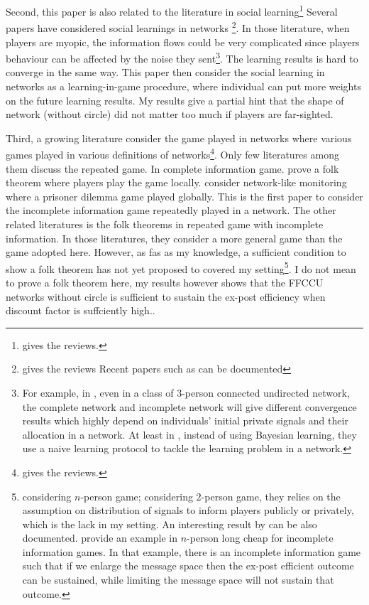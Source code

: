\documentclass[12pt,letter]{article}
\theoremstyle{definition}
\theoremstyle{remark}
\theoremstyle{claim}
\begin{document}
Second, this paper is also related to the literature in social learning\footnote{\citep{Bikhchandani1998} \citep{Cao2001} gives the reviews.} Several papers have considered social learnings in networks \footnote{\citep{Goyal2012} gives the reviews Recent papers such as \citep{Acemoglu2011}\citep{Chatterjee2011} can be documented}. In those literature, when players are myopic, the information flows could be very complicated since players behaviour can be affected by the noise they sent\footnote{For example, in \citep{RePEc:eee:gamebe:v:45:y:2003:i:2:p:329-346},  even in a class of 3-person connected undirected network, the complete network and incomplete network will give different convergence results which highly depend on individuals' initial private signals and their allocation in a network. At least in \citep{Golub2010}, instead of using Bayesian learning, they use a naive learning protocol to tackle the learning problem in a network.}. The learning results is hard to converge in the same way. This paper then consider the social learning in networks as a learning-in-game procedure, where individual can put more weights on the future learning results. My results give a partial hint that the shape of network (without circle) did not matter too much if players are far-sighted.

Third, a growing literature consider the game played in networks where various games played in various definitions of networks\footnote{\citep{Jackson2008}\citep{Goyal2012} gives the reviews.}. Only few literatures among them discuss the repeated game. In complete information game. \citep{Laclau2012} prove a folk theorem where players play the game locally. \citep{Wolitzky2013} \citep{Wolitzky2014} consider network-like monitoring where a prisoner dilemma game played globally. This is the first paper to consider the incomplete information game repeatedly played in a network. The other related literatures is the folk theorems in repeated game with incomplete information. In those literatures, they consider a more general game than the game adopted here. However, as fas as my knowledge, a sufficient condition to show a folk theorem has not yet proposed to covered my setting\footnote{\citep{Fudenberg2010} \citep{Fudenberg2011} \citep{Wiseman2012} considering $n$-person game; \citep{Yamamoto2014} considering $2$-person game, they relies on the assumption on distribution of signals to inform players publicly or privately, which is the lack in my setting. An interesting result by \citep{Amitai} can be also documented. \citep{Amitai} provide an example in $n$-person long cheap for incomplete information games. In that example, there is an incomplete information game such that if we enlarge the message space then the ex-post efficient outcome can be sustained, while limiting the message space will not sustain that outcome.}. I do not mean to prove a folk theorem here, my results however shows that the FFCCU networks without circle is sufficient to sustain the ex-post efficiency when discount factor is suffciently high.. 
\end{document}
